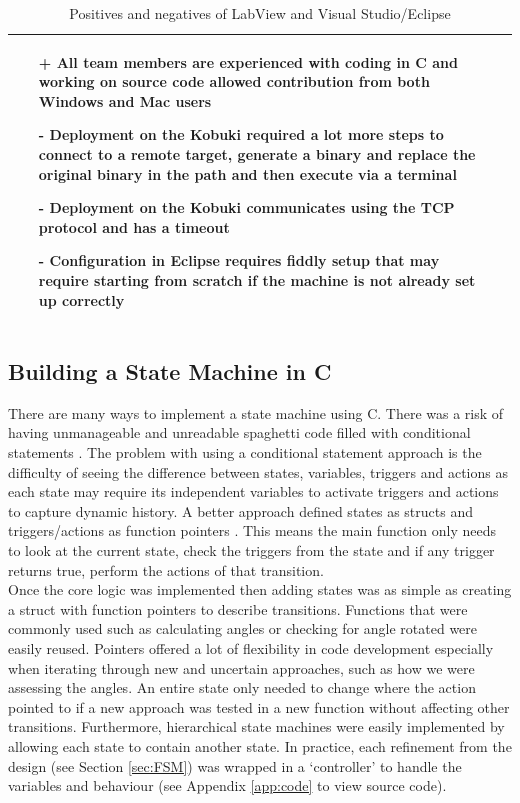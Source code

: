 \begin{table}[!ht]
\begin{tabularx}{\textwidth}{|X|X|}
\begin{itemize}
            \item[+] All team members are experienced with coding in C and working on source code allowed contribution from both Windows and Mac users
            \item[-] Deployment on the Kobuki required a lot more steps to connect to a remote target, generate a binary and replace the original binary in the path and then execute via a terminal
            \item[-] Deployment on the Kobuki communicates using the TCP protocol and has a timeout
            \item[-] Configuration in Eclipse requires fiddly setup that may require starting from scratch if the machine is not already set up correctly
        \end{itemize}\\
        \hline
    \end{tabularx}
    \caption{Positives and negatives of LabView and Visual Studio/Eclipse}
    \label{tab:labviewVSC}
\end{table}

\subsection{Building a State Machine in C}
\vspace{-0.2cm} There are many ways to implement a state machine using C. There was a risk of having unmanageable and unreadable spaghetti code filled with conditional statements \cite{codingFSM}. The problem with using a conditional statement approach is the difficulty of seeing the difference between states, variables, triggers and actions as each state may require its independent variables to activate triggers and actions to capture dynamic history. A better approach defined states as structs and triggers/actions as function pointers \cite{structs_fnc_ptrs}. This means the main function only needs to look at the current state, check the triggers from the state and if any trigger returns true, perform the actions of that transition.\\

Once the core logic was implemented then adding states was as simple as creating a struct with function pointers to describe transitions. Functions that were commonly used such as calculating angles or checking for angle rotated were easily reused. Pointers offered a lot of flexibility in code development especially when iterating through new and uncertain approaches, such as how we were assessing the angles. An entire state only needed to change where the action pointed to if a new approach was tested in a new function without affecting other transitions. Furthermore, hierarchical state machines were easily implemented by allowing each state to contain another state. In practice, each refinement from the design (see Section \ref{sec:FSM}) was wrapped in a `controller' to handle the variables and behaviour (see Appendix \ref{app:code} to view source code).\\

